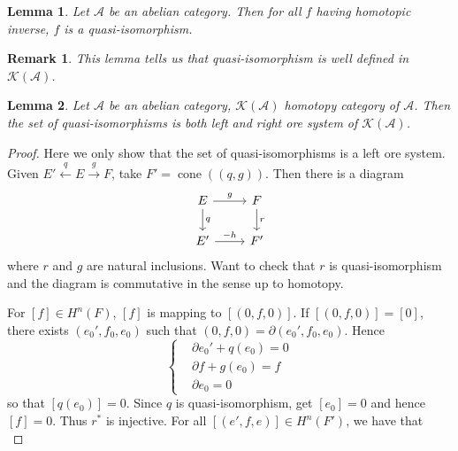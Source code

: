 \documentclass{ctexart}
\newtheorem{remark}{Remark}[section]
\newtheorem{lemma}{Lemma}[section]
\newcommand{\cone}{\operatorname{cone}}
\begin{document}
\begin{lemma}
    Let $\mathscr{A}$ be an abelian category.
    Then for all $f$ having homotopic inverse, $f$ is a quasi-isomorphism.
    \label{Lemma 6.4}
\end{lemma}
\begin{remark}
    This lemma tells us that quasi-isomorphism is well defined in $\mathcal{K}(\mathscr{A})$.
\end{remark}
\begin{lemma}
    Let $\mathscr{A}$ be an abelian category, $\mathcal{K}(\mathscr{A})$ homotopy category of $\mathscr{A}$.
    Then the set of quasi-isomorphisms is both left and right ore system of $\mathcal{K}(\mathscr{A})$.
    \label{Lemma 6.5}
\end{lemma}
\begin{proof}
    Here we only show that the set of quasi-isomorphisms is a left ore system.
    Given $E' \overset{q}{\leftarrow} E \overset{g}{\rightarrow} F$, take $F' = \cone((q, g))$.
    Then there is a diagram
    \begin{equation}
        \begin{tikzcd}
            E \arrow[r, "g"] \arrow[d, "q"] &
            F \arrow[d, "r"] \\
            E' \arrow[r, "-h"] &
            F'
        \end{tikzcd}
    \end{equation}
    where $r$ and $g$ are natural inclusions.
    Want to check that $r$ is quasi-isomorphism and the diagram is commutative in the sense up to homotopy.
    \par
    For $[f]\in H^{n}(F)$, $[f]$ is mapping to $[(0, f, 0)]$.
    If $[(0, f, 0)] = [0]$, there exists $(e_{0}', f_{0}, e_{0})$ such that $(0, f, 0) = \partial (e_{0}', f_{0}, e_{0})$.
    Hence
    \begin{equation}
        \left\{
            \begin{aligned}
                & \partial e_{0}' + q(e_{0}) = 0 \\
                & \partial f + g(e_{0}) = f \\
                & \partial e_{0} = 0
            \end{aligned}
        \right.
    \end{equation}
    so that $[q(e_{0})] = 0$.
    Since $q$ is quasi-isomorphism, get $[e_{0}] = 0$ and hence $[f] = 0$.
    Thus $r^{\ast}$ is injective.
    For all $[(e', f, e)]\in H^{n}(F')$, we have that 
    \begin{equation}

\end{equation}
\end{proof}
\end{document}
